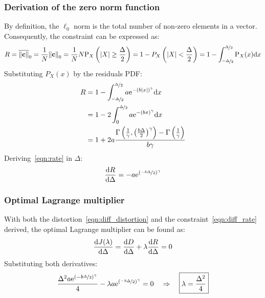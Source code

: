 \documentclass[11pt,a4paper,openright,twoside]{book}
\numberwithin{equation}{section} %
\begin{document}
\subsubsection{Derivation of the zero norm function}
\label{ssub:derivation_of_the_zero_norm_function}

By definition, the $\ell_0$ norm is the total number of non-zero
elements in a vector.
Consequently, the constraint can be expressed as:
\begin{equation}
	R 
	= \overline{\Vert \mathbf{c} \Vert}_0 = \frac{1}{N}{\Vert \mathbf{c} \Vert}_0
	= \frac{1}{N} N \text{P}_X\left(\vert X \vert \ge \frac{\Delta}{2}\right)
	= 1-P_X\left(\vert X \vert < \frac{\Delta}{2}\right)
	= 1-\int_{\nicefrac{-\Delta}{2}}^{\nicefrac{\Delta}{2}}\text{P}_X(x)\text{d} x
	\label{eqn:int_rate}
\end{equation}
Substituting $P_X(x)$ by the residuals \ac{PDF}:
\begin{align}
	R
	&=1-\int_{\nicefrac{-\Delta}{2}}^{\nicefrac{\Delta}{2}}
	a \text{e}^{-{\left(b\vert x \vert\right)}^\gamma} \text{d} x \\
	&=1-2\int_0^{\nicefrac{\Delta}{2}}
	a \text{e}^{-{\left(b x \right)}^\gamma} \text{d} x \\
	&=1+2a\frac{\Gamma\left(
		\frac{1}{\gamma},{\left(\frac{b\Delta}{2}\right)}^\gamma\right)-
		\Gamma\left(\frac{1}{\gamma}\right)}
		{b\gamma}
	\label{eqn:rate}
\end{align}
Deriving~\eqref{eqn:rate} in $\Delta$:
\begin{equation}
	\frac{\text{d} R}{\text{d}\Delta} =
	-a\text{e}^{{\left(\nicefrac{-b\Delta}{2}\right)}^\gamma}
	\label{eqn:diff_rate}
\end{equation}
\subsubsection{Optimal Lagrange multiplier}
\label{ssub:optimal_lagrange_multiplier}

With both the distortion~\eqref{eqn:diff_distortion} and the
constraint~\eqref{eqn:diff_rate} derived, the optimal Lagrange
multiplier can be found as:
\begin{equation}
	\frac{\text{d} J(\lambda)}{\text{d} \Delta}
	= \frac{\text{d} D}{\text{d} \Delta} +
	\lambda \frac{\text{d} R}{\text{d} \Delta} = 0 \\
	\label{eqn:diff_lagrange_multiplier}
\end{equation}
Substituting both derivatives:
\begin{equation}
	\frac{\Delta^2 a \text{e}^{{(-b\nicefrac{\Delta}{2})}^\gamma}}{4}
	- \lambda
	a\text{e}^{{\left(\nicefrac{-b\Delta}{2}\right)}^\gamma} = 0
	\quad \Rightarrow \quad \boxed{\lambda = \frac{\Delta^2}{4}}
\end{equation}
\end{document}
